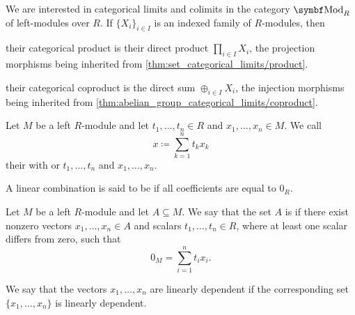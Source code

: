 \begin{proposition}\label{thm:module_categorical_limits}
  We are interested in categorical limits and colimits in the category \( \Cat{Mod}_R \) of left-modules over \( R \). If \( \{ X_i \}_{i \in I} \) is an indexed family of \( R \)-modules, then
  \begin{defenum}
     their categorical product is their direct product \( \prod_{i \in I} X_i \), the projection morphisms being inherited from \cref{thm:set_categorical_limits/product}.

     their categorical coproduct is the direct sum \( \oplus_{i \in I} X_i \), the injection morphisms being inherited from \cref{thm:abelian_group_categorical_limits/coproduct}.
  \end{defenum}
\end{proposition}

\begin{definition}\label{def:linear_combination}
  Let \( M \) be a left \( R \)-module and let \( t_1, \ldots, t_n \in R \) and \( x_1, \ldots, x_n \in M \). We call
  \begin{equation*}
    x \coloneqq \sum_{k=1}^n t_k x_k
  \end{equation*}
  their  with  or  \( t_1, \ldots, t_n \) and  \( x_1, \ldots, x_n \).

  A linear combination is said to be  if all coefficients are equal to \( 0_R \).
\end{definition}

\begin{definition}\label{def:left_module_linear_dependence}
  Let \( M \) be a left \( R \)-module and let \( A \subseteq M \). We say that the set \( A \) is  if there exist nonzero vectors \( x_1, \ldots, x_n \in A \) and scalars \( t_1, \ldots, t_n \in R \), where at least one scalar differs from zero, such that
  \begin{equation*}
    0_M = \sum_{i=1}^n t_i x_i.
  \end{equation*}

  We say that the vectors \( x_1, \ldots, x_n \) are linearly dependent if the corresponding set \( \{ x_1, \ldots, x_n \} \) is linearly dependent.
\end{definition}

